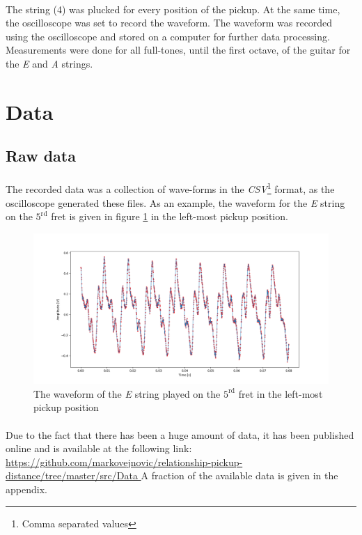\documentclass{article}
\begin{document}
\paragraph*{}
The string (4) was plucked for every position of the pickup. At the same time, 
the oscilloscope was set to record the waveform. The waveform was recorded 
using the oscilloscope and stored on a computer for further data processing. 
Measurements were done for all full-tones, until the first octave, of the 
guitar for the \textit{E} and \textit{A} strings.

\section{Data}

\subsection{Raw data}
\paragraph*{}
The recorded data was a collection of wave-forms in the \textit{CSV}\footnote{
Comma separated values} format, as the oscilloscope generated these files. As 
an example, the waveform for the \textit{E} string on the $5^{\text{rd}}$ fret 
is given in figure \ref{fig:wave-0-5-e} in the left-most pickup position.
\begin{figure}[ht]
	\centering
	\includegraphics[width=\textwidth]{img/wave-0-5-e}
	\caption{The waveform of the \textit{E} string played on the 
	$5^{\text{rd}}$ fret in the left-most pickup position}
	\label{fig:wave-0-5-e}
\end{figure}

\paragraph*{}
Due to the fact that there has been a huge amount of data, it has been 
published online and is available at the following link: 
\url{
	https://github.com/markovejnovic/relationship-pickup-distance/tree/master/src/Data
}
A fraction of the available data is given in the appendix.
\end{document}
